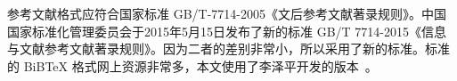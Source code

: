 

参考文献格式应符合国家标准 GB/T-7714-2005《文后参考文献著录规则》。中国国家标准化管理委员会于2015年5月15日发布了新的标准 GB/T 7714-2015《信息与文献参考文献著录规则》。因为二者的差别非常小，所以采用了新的标准。标准的 BiBTeX 格式网上资源非常多，本文使用了李泽平开发的版本~\cite{Lee2016}。
